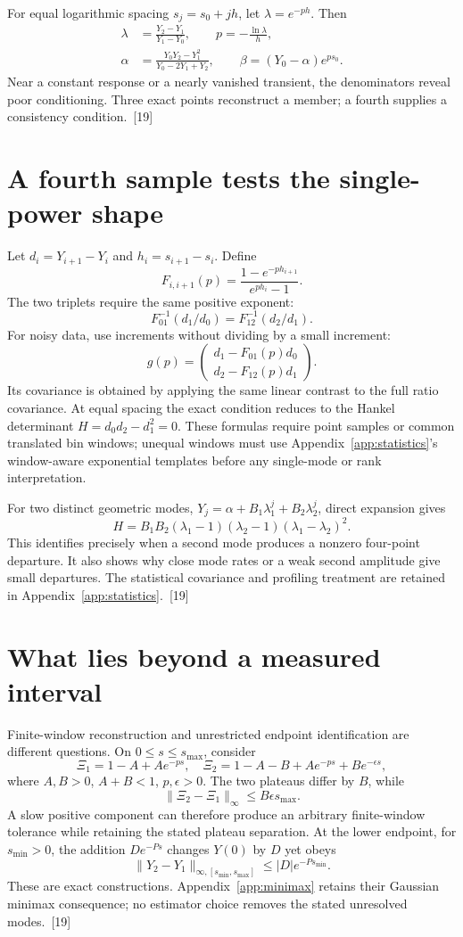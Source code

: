 \documentclass[10pt,twocolumn,letterpaper]{article}
\begin{document}
For equal logarithmic spacing $s_j=s_0+jh$, let $\lambda=e^{-ph}$. Then
\[
\begin{aligned}
 \lambda&=\frac{Y_2-Y_1}{Y_1-Y_0},\qquad p=-\frac{\ln\lambda}{h},\\
 \alpha&=\frac{Y_0Y_2-Y_1^2}{Y_0-2Y_1+Y_2},\qquad
 \beta=(Y_0-\alpha)e^{ps_0}.
\end{aligned}
\]
Near a constant response or a nearly vanished transient, the denominators reveal poor conditioning. Three exact points reconstruct a member; a fourth supplies a consistency condition.~[19]

\section{A fourth sample tests the single-power shape}
Let $d_i=Y_{i+1}-Y_i$ and $h_i=s_{i+1}-s_i$. Define
\[
 F_{i,i+1}(p)=\frac{1-e^{-ph_{i+1}}}{e^{ph_i}-1}.
\]
The two triplets require the same positive exponent:
\[
 F_{01}^{-1}(d_1/d_0)=F_{12}^{-1}(d_2/d_1).
\]
For noisy data, use increments without dividing by a small increment:
\[
 g(p)=\begin{pmatrix}d_1-F_{01}(p)d_0\\d_2-F_{12}(p)d_1\end{pmatrix}.
\]
Its covariance is obtained by applying the same linear contrast to the full ratio covariance. At equal spacing the exact condition reduces to the Hankel determinant $H=d_0d_2-d_1^2=0$. These formulas require point samples or common translated bin windows; unequal windows must use Appendix~\ref{app:statistics}'s window-aware exponential templates before any single-mode or rank interpretation.

For two distinct geometric modes, $Y_j=\alpha+B_1\lambda_1^j+B_2\lambda_2^j$, direct expansion gives
\[
 H=B_1B_2(\lambda_1-1)(\lambda_2-1)(\lambda_1-\lambda_2)^2.
\]
This identifies precisely when a second mode produces a nonzero four-point departure. It also shows why close mode rates or a weak second amplitude give small departures. The statistical covariance and profiling treatment are retained in Appendix~\ref{app:statistics}.~[19]





\section{What lies beyond a measured interval}
Finite-window reconstruction and unrestricted endpoint identification are different questions. On $0\le s\le s_{\max}$, consider
\[
 \Xi_1=1-A+Ae^{-ps},\quad
 \Xi_2=1-A-B+Ae^{-ps}+Be^{-\epsilon s},
\]
where $A,B>0$, $A+B<1$, $p,\epsilon>0$. The two plateaus differ by $B$, while
\[
 \|\Xi_2-\Xi_1\|_\infty\le B\epsilon s_{\max}.
\]
A slow positive component can therefore produce an arbitrary finite-window tolerance while retaining the stated plateau separation. At the lower endpoint, for $s_{\min}>0$, the addition $De^{-Ps}$ changes $Y(0)$ by $D$ yet obeys
\[
 \|Y_2-Y_1\|_{\infty,[s_{\min},s_{\max}]}\le |D|e^{-Ps_{\min}}.
\]
These are exact constructions. Appendix~\ref{app:minimax} retains their Gaussian minimax consequence; no estimator choice removes the stated unresolved modes.~[19]
\end{document}
